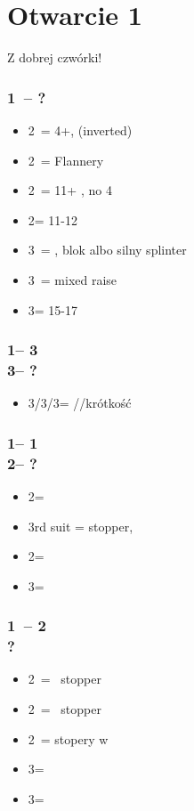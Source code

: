 \documentclass[12pt, a4paper]{report}
\begin{document}
\section*{\colorbox{blue!30}{Otwarcie 1\diams}}
 {
    Z dobrej czwórki!

    \subsubsection*{1\diams\ -- ?}
    \begin{itemize}
        \item 2\diams\ = 4+\diams, \invp (inverted)
        \item 2\hearts\ = Flannery
        \item 2\spades\ = 11+ \bal, no 4\major
        \item 2\nt = 11-12 \bal
        \item 3\clubs\ = \diams, blok albo silny splinter
        \item 3\diams\ = mixed raise
        \item 3\nt = 15-17 \bal
    \end{itemize}

    \subsubsection*{1\diams -- 3\clubs\\
                    3\diams -- ?}
    \begin{itemize}
        \item 3\hearts/3\spades/3\nt = \hearts/\spades/\clubs krótkość
    \end{itemize}

    \subsubsection*{1\diams -- 1\major\\
                    2\diams -- ?}
    \begin{itemize}
        \item 2\major = \nf
        \item 3rd suit = stopper, \gf
        \item 2\nt = \gf
        \item 3\diams = \inv
    \end{itemize}

    \subsubsection*{1\diams\ -- 2\diams \\ ?}
    \begin{itemize}
        \item 2\hearts\ = \hearts\ stopper
        \item 2\spades\ = \spades\ stopper
        \item 2\nt\ = stopery w \major
        \item 3\clubs = \nat
        \item 3\diams = \soff
    \end{itemize}

}
\end{document}
